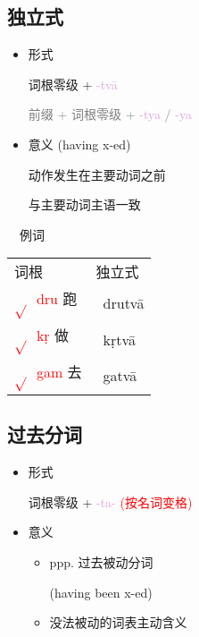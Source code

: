 \documentclass[17pt]{beamer}
\newcommand{\skt}[1]{{\sanskritfont{#1}}} %
\newcommand{\verbroot}[1]{\textcolor{red}{$\sqrt{}$#1}}
\newcommand{\sktroot}[1]{{\verbroot{\skt{#1}}}}
\newcommand{\skttransroot}[1]{{\sktroot{#1}~\textcolor{red}{#1}}}
\newcommand{\fullpada}[1]{\textcolor{OliveGreen}{#1}}
\newcommand{\sktpada}[1]{{\textcolor{OliveGreen}{\skt{#1}}}}
\newcommand{\skttranspada}[1]{{\sktpada{#1}~\fullpada{#1}}}
\newcommand{\pratyaya}[1]{\textcolor{Plum}{#1}}
\newcommand{\veryimportant}[1]{\textcolor{red}{#1}}
\newcommand{\notsoimportant}[1]{\textcolor{gray}{#1}}
\begin{document}
\subsection{独立式}
\begin{frame}{\insertsubsection}
  \begin{itemize}
    \item 形式
    
    词根零级 + \pratyaya{\nobreakdash-tvā} 

    \notsoimportant{前缀 + 词根零级 + \pratyaya{\nobreakdash-tya} / \pratyaya{\nobreakdash-ya}}
    \item 意义 (having x\nobreakdash-ed)
    
    动作发生在主要动词之前 

    与主要动词主语一致
  \end{itemize}
\end{frame}

\begin{frame}{\insertsubsection  ~~例词}
  \centering
  \begin{tabular}{@{}ll@{}} %
    词根 & 独立式  \\
    \skttransroot{dru} 跑 & \skttranspada{drutvā}  \\
    \skttransroot{kṛ} 做 & \skttranspada{kṛtvā}  \\
    \skttransroot{gam} 去 & \skttranspada{gatvā}  \\
  \end{tabular}
\end{frame}

\subsection{过去分词}
\begin{frame}{\insertsubsection }
  \begin{itemize}
    \item 形式
    
    词根零级 + \pratyaya{\nobreakdash-ta\nobreakdash-} \veryimportant{(按名词变格)}
    \item 意义
    \begin{itemize}
      \item ppp. 过去被动分词
      
      (having been x\nobreakdash-ed)
      \item 没法被动的词表主动含义
    \end{itemize}
  \end{itemize}
\end{frame}
\end{document}
